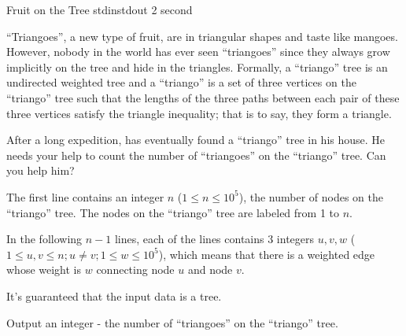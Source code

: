 
\begin{problem}{Fruit on the Tree}
{stdin}{stdout}
{2 second}{}{}

``Triangoes'', a new type of fruit, are in triangular shapes and taste like mangoes. However, nobody in the world has ever seen ``triangoes'' since they always grow implicitly on the tree and hide in the triangles. Formally, a ``triango'' tree is an undirected weighted tree and a ``triango'' is a set of three vertices on the ``triango'' tree such that the lengths of the three paths between each pair of these three vertices satisfy the triangle inequality; that is to say, they form a triangle.

After a long expedition, \Suzukaze has eventually found a ``triango'' tree in his house. He needs your help to count the number of ``triangoes'' on the ``triango'' tree. Can you help him?

\InputFile

The first line contains an integer $n$ ($1 \le n \le 10^5$), the number of nodes on the ``triango'' tree. The nodes on the ``triango'' tree are labeled from 1 to $n$.

In the following $n-1$ lines, each of the lines contains 3 integers $u, v, w$ ($1 \le u,v \le n; u \neq v;1 \le w \le 10^5$), which means that there is a weighted edge whose weight is $w$ connecting node $u$ and node $v$.

It's guaranteed that the input data is a tree.

\OutputFile

Output an integer - the number of ``triangoes'' on the ``triango'' tree.

\Examples

\begin{example}
%
\end{example}

\end{problem}
